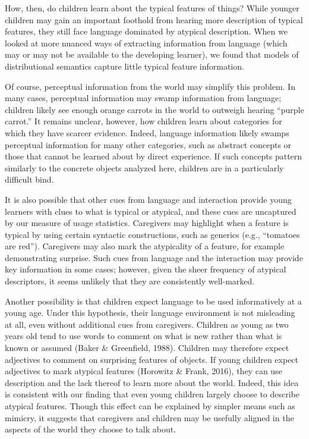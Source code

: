 \documentclass[10pt, letterpaper]{article}
\begin{document}
How, then, do children learn about the typical features of things? While
younger children may gain an important foothold from hearing more
description of typical features, they still face language dominated by
atypical description. When we looked at more nuanced ways of extracting
information from language (which may or may not be available to the
developing learner), we found that models of distributional semantics
capture little typical feature information.

Of course, perceptual information from the world may simplify this
problem. In many cases, perceptual information may swamp information
from language; children likely see enough orange carrots in the world to
outweigh hearing ``purple carrot.'' It remains unclear, however, how
children learn about categories for which they have scarcer evidence.
Indeed, language information likely swamps perceptual information for
many other categories, such as abstract concepts or those that cannot be
learned about by direct experience. If such concepts pattern similarly
to the concrete objects analyzed here, children are in a particularly
difficult bind.

It is also possible that other cues from language and interaction
provide young learners with clues to what is typical or atypical, and
these cues are uncaptured by our measure of usage statistics. Caregivers
may highlight when a feature is typical by using certain syntactic
constructions, such as generics (e.g., ``tomatoes are red''). Caregivers
may also mark the atypicality of a feature, for example demonstrating
surprise. Such cues from language and the interaction may provide key
information in some cases; however, given the sheer frequency of
atypical descriptors, it seems unlikely that they are consistently
well-marked.

Another possibility is that children expect language to be used
informatively at a young age. Under this hypothesis, their language
environment is not misleading at all, even without additional cues from
caregivers. Children as young as two years old tend to use words to
comment on what is new rather than what is known or assumed (Baker \&
Greenfield, 1988). Children may therefore expect adjectives to comment
on surprising features of objects. If young children expect adjectives
to mark atypical features (Horowitz \& Frank, 2016), they can use
description and the lack thereof to learn more about the world. Indeed,
this idea is consistent with our finding that even young children
largely choose to describe atypical features. Though this effect can be
explained by simpler means such as mimicry, it suggests that caregivers
and children may be usefully aligned in the aspects of the world they
choose to talk about.
\end{document}
